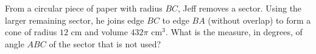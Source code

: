 From a circular piece of paper with radius $BC$, Jeff removes a sector. Using the larger remaining sector, he joins edge $BC$ to edge $BA$ (without overlap) to form a cone of radius $12$ cm and volume $432\pi$ cm$^3$. What is the measure, in degrees, of angle $ABC$ of the sector that is not used?
